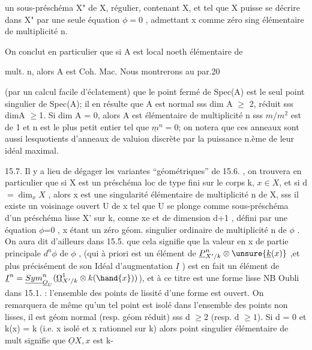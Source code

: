 
un sous-préschéma X" de X, régulier,  contenant X, et tel que X
puisse se décrire dans X" par une seule équation $\phi = 0$ , admettant x comme
zéro sing élémentaire de multiplicité n.

On conclut en particulier que si A est local noeth élémentaire de

mult. n, alors A est Coh. Mac.  Nous montrerons au par.20

(par un calcul facile d'éclatement) que le point fermé de Spec(A) est
le seul point singulier de Spec(A); il en résulte que  A est normal
sss dim A $\geqslant$ 2, réduit sss dimA $\geqslant$1. Si dim A = 0, alors  A est élémentaire
de multiplicité n sss  $m/m^2$ est de 1 et  n est le plus petit entier
tel que $\underline{m}^n = 0$; on notera que ces anneaux sont aussi lesquotients d'anneaux
de valuion discrète par la puissance n.ème de leur idéal maximal.

15.7.   Il y a lieu de dégager les variantes ``géométriques'' de 15.6. ,
on trouvera en particulier que si X est un préschéma loc de type fini sur
le corps k, $x \in X$, et si d $= \dim_x X$ , alors  x est une singularité 
élémentaire
 de multiplicité  n de X, sss il existe un voisinage ouvert U de x
tel que U se plonge comme sous-préschéma d'un préschéma lisse X' sur k,
 conne xe et de dimension d+1 , défini par une équation $\phi$=0 , x étant
un zéro géom. singulier ordinaire de multiplicité n de $\phi$ . On aura dit d'ailleurs
\placedmargin{$\surd$} dans 15.5. que cela signifie  que  la valeur en x de partie principale $d^n\phi$ de $\phi$ , 
 (qui à priori est un  élément de $\underline{P}^n_{X'/k}\otimes \unsure{\underline{k}(x)}$ ,et plus
précisément de son Idéal d'augmentation $\underline{I}$ )  est en fait un élément de
 $\underline{I}^n = \underline{Sym}^n_{\underline{O}_U}(\underline{\Omega}^1_{X'/k}\otimes k(\hand{x}))$), et  à ce titre est une  forme lisse 
\placedmargin{|} \hand{[}NB Oubli dans 15.1. : l'ensemble des points de lissité d'une forme est
\placedmargin{|} ouvert\hand{]}. On remarquera de même qu'un tel point est isolé dans l'ensemble
des points non lisses, il est géom normal  (resp. géom réduit) sss
d $\geqslant 2$  (resp. d $\geqslant 1$). Si d = 0 et k(x) = k (i.e. x  isolé et x rationnel sur k) alors 
point singulier élémentaire  de mult\hand{,}  signifie que $\underline{O}X,x$  est  k-

